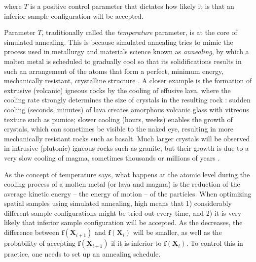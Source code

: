 \noindent where $T$ is a positive control parameter that dictates how likely it is that an inferior sample 
configuration will be accepted.

Parameter $T$, traditionally called the \emph{temperature} parameter, is at the core of simulated annealing. 
This is because simulated annealing tries to mimic the process used in metallurgy and materials science known 
as \emph{annealing}, by which a molten metal is scheduled to gradually cool so that its solidifications results 
in such an arrangement of the atoms that form a perfect, minimum energy, mechanically resistant, crystalline 
structure \cite{MetropolisEtAl1953, KirkpatrickEtAl1983, Cerny1985}. A closer example is the formation of 
extrusive (volcanic) igneous rocks by the cooling of effusive lava, where the cooling rate strongly determines 
the size of crystals in the resulting rock \cite{HaldarEtAl2014}: sudden cooling (seconds, minutes) of lava 
creates amorphous volcanic glass with vitreous texture such as pumice; slower cooling (hours, weeks) enables 
the growth of crystals, which can sometimes be visible to the naked eye, resulting in more mechanically 
resistant rocks such as basalt. Much larger crystals will be observed in intrusive (plutonic) igneous rocks 
such as granite, but their growth is due to a very slow cooling of magma, sometimes thousands or millions of 
years \cite{HaldarEtAl2014}.

As the concept of temperature says, what happens at the atomic level during the cooling process of a molten 
metal (or lava and magma) is the reduction of the average kinetic energy -- the energy of motion -- of the 
particles. When optimizing spatial samples using simulated annealing, high  means that 1) 
considerably different sample configurations might be tried out every time, and 2) it is very likely that 
inferior sample configuration will be accepted. As the  decreases, the difference between 
$\boldsymbol{f}(\boldsymbol{X}_{i + 1})$ and $\boldsymbol{f}(\boldsymbol{X}_i)$ will be smaller, as well as 
the probability of accepting $\boldsymbol{f}(\boldsymbol{X}_{i + 1})$ if it is inferior to 
$\boldsymbol{f}(\boldsymbol{X}_i)$. To control this in practice, one needs to set up an annealing schedule.

